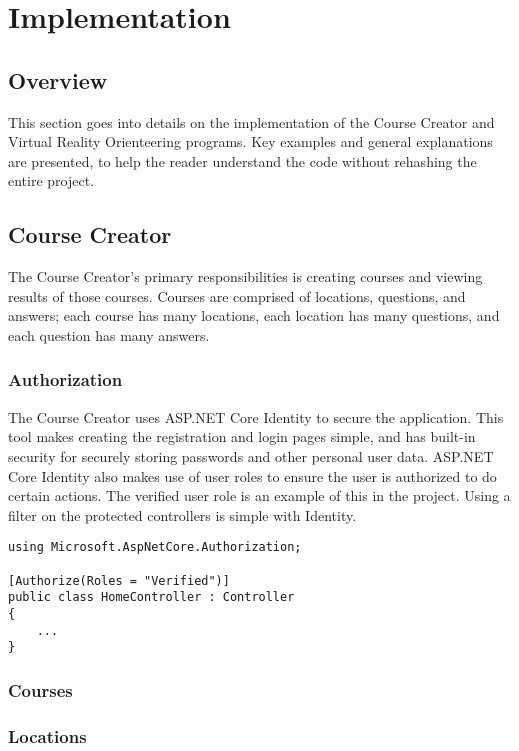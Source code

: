 \section{Implementation}																	
\label{sec:Implementation}

\subsection{Overview} 
This section goes into details on the implementation of the Course Creator and Virtual Reality Orienteering programs. Key examples and general explanations are presented, to help the reader understand the code without rehashing the entire project. 

\subsection{Course Creator}
The Course Creator's primary responsibilities is creating courses and viewing results of those courses. Courses are comprised of locations, questions, and answers; each course has many locations, each location has many questions, and each question has many answers. 

\subsubsection{Authorization}
The Course Creator uses ASP.NET Core Identity to secure the application. This tool makes creating the registration and login pages simple, and has built-in security for securely storing passwords and other personal user data. ASP.NET Core Identity also makes use of user roles to ensure the user is authorized to do certain actions. The verified user role is an example of this in the project. Using a filter on the protected controllers is simple with Identity.
\begin{lstlisting}[caption=Securing Controllers using Filter on User Role, label=lst:FilterUserRole]
using Microsoft.AspNetCore.Authorization;

[Authorize(Roles = "Verified")]
public class HomeController : Controller
{
	...
}
\end{lstlisting} 
\subsubsection{Courses}

\subsubsection{Locations}

